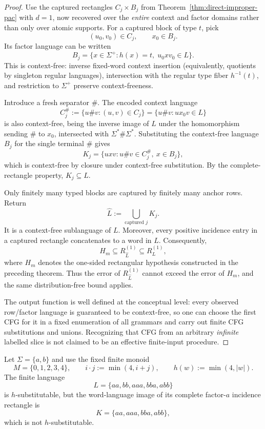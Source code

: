 \begin{proof}
Use the captured rectangles \(C_j\times B_j\) from
Theorem~\ref{thm:direct-improper-pac} with \(d=1\),
now recovered over the \emph{entire} context and factor
domains rather than only over atomic supports.
For a captured block of type \(t\), pick
\[
 (u_0,v_0)\in C_j,\qquad x_0\in B_j.
\]
Its factor language can be written
\[
 B_j=\{x\in\Sigma^+:h(x)=t,\;u_0xv_0\in L\}.
\]
This is context-free: inverse fixed-word context
insertion (equivalently, quotients by singleton regular
languages), intersection with the regular type fiber
\(h^{-1}(t)\), and restriction to \(\Sigma^+\)
preserve context-freeness.

Introduce a fresh separator \(\#\).  The encoded
context language
\[
 C_j^\#:=\{u\#v:(u,v)\in C_j\}
       =\{u\#v:ux_0v\in L\}
\]
is also context-free, being the inverse image of
\(L\) under the homomorphism sending
\(\#\) to \(x_0\), intersected with
\(\Sigma^*\#\Sigma^*\).
Substituting the context-free language \(B_j\)
for the single terminal \(\#\) gives
\[
 K_j=\{uxv:u\#v\in C_j^\#,\ x\in B_j\},
\]
which is context-free by closure under
context-free substitution.  By the complete-rectangle
property, \(K_j\subseteq L\).

Only finitely many typed blocks are captured
by finitely many anchor rows.  Return
\[
 \widehat L:=\bigcup_{\text{captured }j}K_j.
\]
It is a context-free sublanguage of \(L\).
Moreover, every positive incidence entry in
a captured rectangle concatenates to a word
in \(\widehat L\).  Consequently,
\[
 H_m\subseteq R_{\widehat L}^{(1)}
       \subseteq R_L^{(1)},
\]
where \(H_m\) denotes the one-sided rectangular
hypothesis constructed in the preceding theorem.
Thus the error of \(R_{\widehat L}^{(1)}\) cannot
exceed the error of \(H_m\), and the same
distribution-free bound applies.

The output function is well defined at the
conceptual level: every observed row/factor
language is guaranteed to be context-free,
so one can choose the first CFG for it in a
fixed enumeration of all grammars and carry
out finite CFG substitutions and unions.
Recognizing that CFG from an arbitrary
\emph{infinite} labelled slice is not claimed
to be an effective finite-input procedure.
\end{proof}

\begin{proposition}
\label{prop:captured-not-substitutable}
Let \(\Sigma=\{a,b\}\) and use the fixed finite monoid
\[
 M=\{0,1,2,3,4\},\qquad
 i\cdot j:=\min(4,i+j),\qquad
 h(w):=\min(4,|w|).
\]
The finite language
\[
 L=\{aa,bb,aaa,bba,abb\}
\]
is \(h\)-substitutable, but the word-language image
of its complete factor-\(a\) incidence rectangle is
\[
 K=\{aa,aaa,bba,abb\},
\]
which is not \(h\)-substitutable.
\end{proposition}

